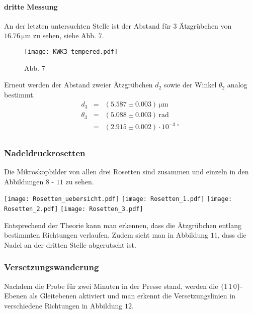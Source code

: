 \documentclass[12pt,a4paper]{scrartcl}
\numberwithin{equation}{section} %
\renewcommand{\[}{} %
\renewcommand{\]}{\noindent} %
\begin{document}
\hypertarget{dritte-messung}{%
\paragraph{dritte Messung}\label{dritte-messung}}

An der letzten untersuchten Stelle ist der Abstand für \(3\) Ätzgrübchen
von \(16.76 \mathrm{\, \mu m}\) zu sehen, siehe Abb. \(7\).

\begin{figure}
\centering
\texttt{[image: KWK3\_tempered.pdf]}
\caption{Abb. 7}
\end{figure}

Erneut werden der Abstand zweier Ätzgrübchen \(d_2\) sowie der Winkel
\(\theta_2\) analog bestimmt. \[
\begin{eqnarray}
    d_3 &=& (5.587 \pm 0.003) \mathrm{\, \mu m} \\
    \theta_3 &=& (5.088 \pm 0.003) \mathrm{\, rad} \\
        &=& (2.915 \pm 0.002) \cdot 10^{-3\ \circ} \\
\end{eqnarray}
\]

\hypertarget{nadeldruckrosetten-1}{%
\subsubsection{Nadeldruckrosetten}\label{nadeldruckrosetten-1}}

Die Mikroskopbilder von allen drei Rosetten sind zusammen und einzeln in
den Abbildungen \(8\) - \(11\) zu sehen.

\texttt{[image: Rosetten\_uebersicht.pdf]}
\texttt{[image: Rosetten\_1.pdf]} \texttt{[image: Rosetten\_2.pdf]}
\texttt{[image: Rosetten\_3.pdf]}

Entsprechend der Theorie kann man erkennen, dass die Ätzgrübchen entlang
bestimmten Richtungen verlaufen. Zudem sieht man in Abbildung \(11\),
dass die Nadel an der dritten Stelle abgerutscht ist.

\hypertarget{versetzungswanderung}{%
\subsubsection{Versetzungswanderung}\label{versetzungswanderung}}

Nachdem die Probe für zwei Minuten in der Presse stand, werden die
\(\lbrace1\,1\,0\rbrace\)-Ebenen als Gleitebenen aktiviert und man
erkennt die Versetzungslinien in verschiedene Richtungen in Abbildung
\(12\).
\end{document}

